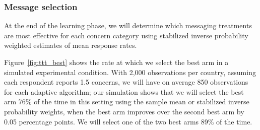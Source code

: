 \documentclass[letterpaper, 12pt, parskip=full,DIV=10]{scrartcl}
\begin{document}
\subsubsection{Message selection}\label{message}

At the end of the learning phase, we will determine which messaging treatments are most effective for each concern category using stabilized inverse probability weighted estimates of mean response rates. 

Figure~\ref{fig:ttt_best} shows the rate at which we select the best arm in a simulated experimental condition. With 2,000 observations per country, assuming each respondent reports 1.5 concerns, we will have on average 850 observations for each adaptive algorithm; our simulation shows that we will select the best arm 76\% of the time in this setting using the sample mean or stabilized inverse probability weights, when the best arm improves over the second best arm by 0.05 percentage points. We will select one of the two best arms 89\% of the time. 
\end{document}
